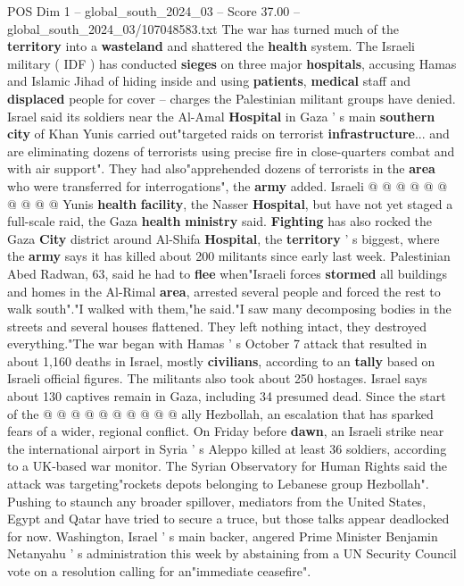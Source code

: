 \begin{textsample}{POS Dim 1 – global\_south\_2024\_03 – Score 37.00 – global\_south\_2024\_03/107048583.txt}
The war has turned much of the \textbf{territory} into a \textbf{wasteland} and shattered the \textbf{health} system.
The Israeli military ( IDF ) has conducted \textbf{sieges} on three major \textbf{hospitals}, accusing Hamas and Islamic Jihad of hiding inside and using \textbf{patients}, \textbf{medical} staff and \textbf{displaced} people for cover -- charges the Palestinian militant groups have denied.
Israel said its soldiers near the Al-Amal \textbf{Hospital} in Gaza ' s main \textbf{southern} \textbf{city} of Khan Yunis carried out"targeted raids on terrorist \textbf{infrastructure}... and are eliminating dozens of terrorists using precise fire in close-quarters combat and with air support".
They had also"apprehended dozens of terrorists in the \textbf{area} who were transferred for interrogations", the \textbf{army} added.
Israeli @ @ @ @ @ @ @ @ @ @ Yunis \textbf{health} \textbf{facility}, the Nasser \textbf{Hospital}, but have not yet staged a full-scale raid, the Gaza \textbf{health} \textbf{ministry} said. \textbf{Fighting} has also rocked the Gaza \textbf{City} district around Al-Shifa \textbf{Hospital}, the \textbf{territory} ' s biggest, where the \textbf{army} says it has killed about 200 militants since early last week.
Palestinian Abed Radwan, 63, said he had to \textbf{flee} when"Israeli forces \textbf{stormed} all buildings and homes in the Al-Rimal \textbf{area}, arrested several people and forced the rest to walk south"."I walked with them,"he said."I saw many decomposing bodies in the streets and several houses flattened.
They left nothing intact, they destroyed everything."The war began with Hamas ' s October 7 attack that resulted in about 1,160 deaths in Israel, mostly \textbf{civilians}, according to an \textbf{tally} based on Israeli official figures.
The militants also took about 250 hostages.
Israel says about 130 captives remain in Gaza, including 34 presumed dead.
Since the start of the @ @ @ @ @ @ @ @ @ @ ally Hezbollah, an escalation that has sparked fears of a wider, regional conflict.
On Friday before \textbf{dawn}, an Israeli strike near the international airport in Syria ' s Aleppo killed at least 36 soldiers, according to a UK-based war monitor.
The Syrian Observatory for Human Rights said the attack was targeting"rockets depots belonging to Lebanese group Hezbollah".
Pushing to staunch any broader spillover, mediators from the United States, Egypt and Qatar have tried to secure a truce, but those talks appear deadlocked for now.
Washington, Israel ' s main backer, angered Prime Minister Benjamin Netanyahu ' s administration this week by abstaining from a UN Security Council vote on a resolution calling for an"immediate ceasefire".

\end{textsample}
